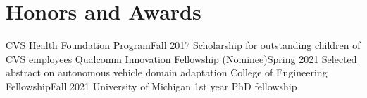 \section{Honors and Awards}
  \CVSubHeadingListStart
    \CVSubheading
      {CVS Health Foundation Program}{Fall 2017}
      {Scholarship for outstanding children of CVS employees}{}
    \CVSubheading
      {Qualcomm Innovation Fellowship (Nominee)}{Spring 2021}
      {Selected abstract on autonomous vehicle domain adaptation}{}
    \CVSubheading
      {College of Engineering Fellowship}{Fall 2021}
      {University of Michigan 1st year PhD fellowship}{}
  \CVSubHeadingListEnd